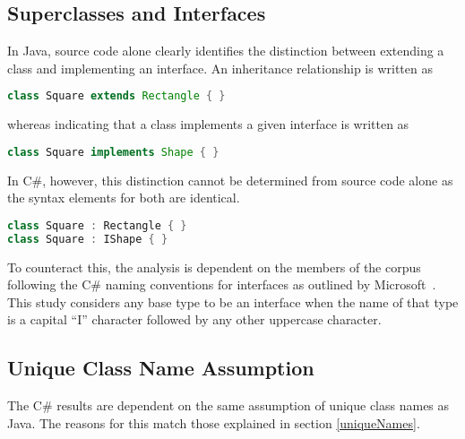 \subsection{Superclasses and Interfaces}
In Java, source code alone clearly identifies the distinction between extending a class and implementing an interface. An inheritance relationship is written as
\begin{lstlisting}[language=java]
class Square extends Rectangle { }
\end{lstlisting}
whereas indicating that a class implements a given interface is written as
\begin{lstlisting}[language=java]
class Square implements Shape { }
\end{lstlisting}
In C\#, however, this distinction cannot be determined from source code alone as the syntax elements for both are identical.
\begin{lstlisting}[language=cs]
class Square : Rectangle { }
class Square : IShape { }
\end{lstlisting}
To counteract this, the analysis is dependent on the members of the corpus following the C\# naming conventions for interfaces as outlined by Microsoft~\cite{InterfaceNaming}. This study considers any base type to be an interface when the name of that type is a capital ``I'' character followed by any other uppercase character.

\subsection{Unique Class Name Assumption}
The C\# results are dependent on the same assumption of unique class names as Java. The reasons for this match those explained in section \ref{uniqueNames}.

